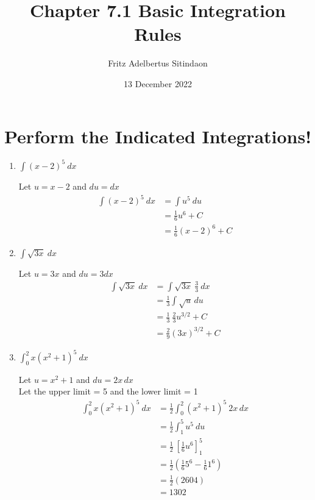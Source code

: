 \documentclass[12pt]{article}
\title{Chapter 7.1 Basic Integration Rules}
\author{Fritz Adelbertus Sitindaon}
\date{13 December 2022}
\begin{document}
\maketitle

\section{Perform the Indicated Integrations!}  
  
\begin{enumerate}
\item $\displaystyle\int(x-2)^5 \ dx $

Let $u = x-2$ and $du = dx$
\begin{equation*}
\begin{aligned}
\int(x-2)^5 \ dx &= \int u^5 \ du \\
&= \frac{1}{6}u^6 + C \\
&= \frac{1}{6}(x-2)^6 + C
\end{aligned}
\end{equation*}

\item $\displaystyle\int\sqrt{3x} \ dx $

Let $u = 3x$ and $du = 3dx$
\begin{equation*}
\begin{aligned}
\int \sqrt{3x} \ dx &= \int \sqrt{3x}\ \frac{3}{3} \ dx \\
&= \frac{1}{3} \int \sqrt{u} \, du \\
&= \frac{1}{3} \ \frac{2}{3} u^{3/2} + C \\
&= \frac{2}{9} (3x)^{3/2} + C
\end{aligned}
\end{equation*}
  
\item $\displaystyle\int_0^2x(x^2+1)^5 \ dx $

Let $u = x^2+1$ and $du = 2x\,dx$ \\
Let the upper limit = 5 and the lower limit = 1 
\begin{equation*}
\begin{aligned}
\int_0^2x(x^2+1)^5 \ dx  &= \frac{1}{2} \int_0^2(x^2+1)^5 \ 2x\,dx \\
&= \frac{1}{2} \int_1^5 u^5 \ du \\
&= \frac{1}{2} \ \left[\frac{1}{6} u^6\right]_1^5 \\
&= \frac{1}{2} \left(\frac{1}{6} 5^6 - \frac{1}{6} 1^6 \right) \\
&= \frac{1}{2} (2604) \\
&= 1302
\end{aligned}
\end{equation*}


\end{enumerate}
\end{document}
